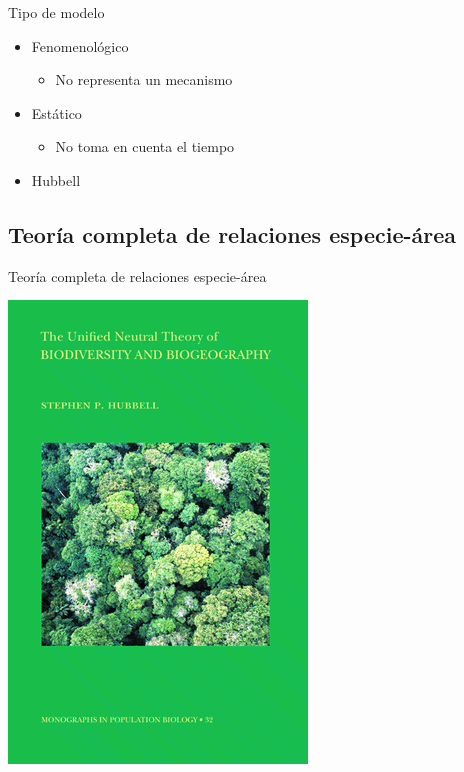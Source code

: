 \documentclass[
  11pt,
  ignorenonframetext,
]{beamer}
\providecommand{\tightlist}{%
  \setlength{\itemsep}{0pt}\setlength{\parskip}{0pt}}
\begin{document}
\begin{frame}{Tipo de modelo}
\begin{itemize}
\item
  Fenomenológico

  \begin{itemize}
  \tightlist
  \item
    No representa un mecanismo
  \end{itemize}
\item
  Estático

  \begin{itemize}
  \tightlist
  \item
    No toma en cuenta el tiempo
  \end{itemize}
\item
  Hubbell
\end{itemize}
\end{frame}

\hypertarget{teoruxeda-completa-de-relaciones-especie-uxe1rea}{%
\subsection{Teoría completa de relaciones
especie-área}\label{teoruxeda-completa-de-relaciones-especie-uxe1rea}}

\begin{frame}{Teoría completa de relaciones especie-área}
\begin{center}\includegraphics{Biogeografia/Hubbell} \end{center}
\end{frame}
\end{document}
